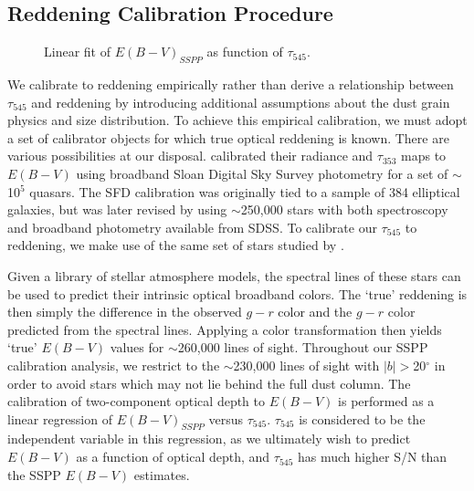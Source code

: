 \documentclass{emulateapj}
\begin{document}
\subsection{Reddening Calibration Procedure}

\begin{figure}
\begin{center}
\caption{\label{fig:calib} Linear fit of $E(B-V)_{SSPP}$ as function of
$\tau_{545}$.}
\end{center}
\end{figure}

We calibrate to reddening empirically rather than derive
a relationship between $\tau_{545}$ and reddening by introducing additional 
assumptions about the dust grain physics and size distribution. To achieve this
empirical calibration, we must adopt a set of calibrator objects for which true
optical reddening is known. There are various possibilities at our disposal. 
\cite{planckdust} calibrated their radiance and $\tau_{353}$ maps to $E(B-V)$ 
using broadband Sloan Digital Sky Survey \citep[SDSS;][]{sdss} photometry for a
set of $\sim$10$^5$ quasars. The SFD calibration was originally tied to a 
sample of 384 elliptical galaxies, but was later revised by \cite{schlafly11} 
using $\sim$250,000 stars with both spectroscopy and broadband photometry 
available from SDSS. To calibrate our $\tau_{545}$ to reddening, we make use of
the same set of stars studied by \cite{schlafly11}.




Given a library of stellar atmosphere models, the spectral lines of these stars
can be used to predict their intrinsic optical broadband colors. The `true' 
reddening is then simply the difference in the observed $g-r$ color and the 
$g-r$ color predicted from the spectral lines. Applying a color transformation 
then yields `true' $E(B-V)$ values for $\sim$260,000 lines of sight. Throughout
our SSPP calibration analysis, we restrict to the $\sim$230,000 lines of sight 
with $|b|$$>$20$^{\circ}$ in order to avoid stars which may not lie behind the 
full dust column. The calibration of two-component optical depth to $E(B-V)$ is
performed as a linear regression of $E(B-V)_{SSPP}$ versus $\tau_{545}$. 
$\tau_{545}$ is considered to be the independent variable in this regression, 
as we ultimately wish to predict $E(B-V)$ as a function of optical depth, and 
$\tau_{545}$ has much higher S/N than the SSPP $E(B-V)$ estimates.
\end{document}

